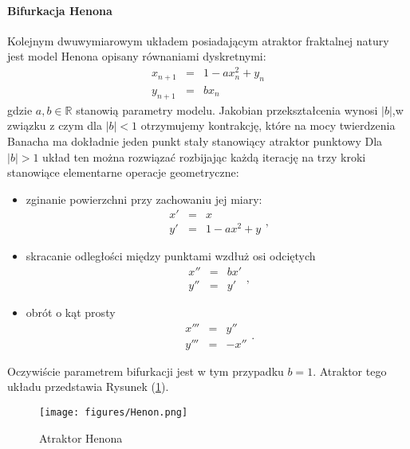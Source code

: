 \documentclass[12pt, twoside]{book}
\begin{document}
\paragraph{Bifurkacja Henona}
Kolejnym dwuwymiarowym układem posiadającym atraktor fraktalnej natury jest model Henona opisany równaniami dyskretnymi:
\begin{equation}
\begin{array}{rcl} 
x_{n+1} & = & 1-ax_{n}^2+y_{n} \\
y_{n+1} & = & bx_{n}
\end{array}
\end{equation}
gdzie $ a,b \in \mathbb{R} $ stanowią parametry modelu. Jakobian przekształcenia wynosi $ |b| $,w związku z czym dla $ |b|<1 $ otrzymujemy kontrakcję, które na mocy twierdzenia Banacha ma dokładnie jeden punkt stały stanowiący atraktor punktowy\newline
Dla $ |b|>1 $ układ ten można rozwiązać rozbijając każdą iterację na trzy kroki stanowiące elementarne operacje geometryczne:
\begin{itemize}
	\item zginanie powierzchni przy zachowaniu jej miary:
	\begin{equation}
	\begin{array}{rcl} 
	x' & = & x \\
	y' & = & 1-ax^{2}+y
	\end{array},
	\end{equation}
	\item skracanie odległości między punktami wzdłuż osi odciętych
	\begin{equation}
	\begin{array}{rcl} 
	x'' & = & bx' \\
	y'' & = & y'
	\end{array},
	\end{equation}
	\item obrót o kąt prosty
	\begin{equation}
	\begin{array}{rcl} 
	x''' & = & y'' \\
	y''' & = & -x''
	\end{array}.
	\end{equation}
\end{itemize}
Oczywiście parametrem bifurkacji jest w tym przypadku $ b=1 $. Atraktor tego układu przedstawia Rysunek (\ref{Fig10}).
\begin{figure}[H]
	\texttt{[image: figures/Henon.png]} 
	\centering
	\caption{Atraktor Henona}
	\label{Fig10}
\end{figure}
\end{document}
